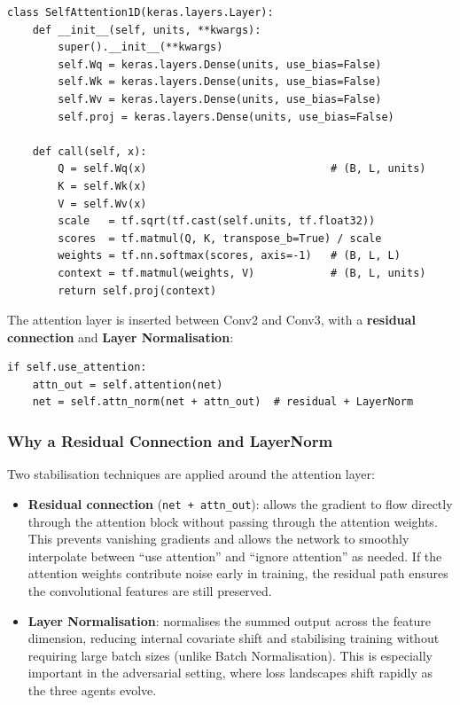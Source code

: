 \documentclass[12pt, a4paper]{article}
\newcommand{\code}[1]{\texttt{\color{CodeRed}#1}}
\begin{document}
\begin{lstlisting}[caption={\code{SelfAttention1D} in \code{main\_enhanced.py}}]
class SelfAttention1D(keras.layers.Layer):
    def __init__(self, units, **kwargs):
        super().__init__(**kwargs)
        self.Wq = keras.layers.Dense(units, use_bias=False)
        self.Wk = keras.layers.Dense(units, use_bias=False)
        self.Wv = keras.layers.Dense(units, use_bias=False)
        self.proj = keras.layers.Dense(units, use_bias=False)

    def call(self, x):
        Q = self.Wq(x)                             # (B, L, units)
        K = self.Wk(x)
        V = self.Wv(x)
        scale   = tf.sqrt(tf.cast(self.units, tf.float32))
        scores  = tf.matmul(Q, K, transpose_b=True) / scale
        weights = tf.nn.softmax(scores, axis=-1)   # (B, L, L)
        context = tf.matmul(weights, V)            # (B, L, units)
        return self.proj(context)
\end{lstlisting}

The attention layer is inserted between Conv2 and Conv3, with a
\textbf{residual connection} and \textbf{Layer Normalisation}:

\begin{lstlisting}[caption={Residual attention block in \code{CipherNet.call()}}]
if self.use_attention:
    attn_out = self.attention(net)
    net = self.attn_norm(net + attn_out)  # residual + LayerNorm
\end{lstlisting}

\subsubsection*{Why a Residual Connection and LayerNorm}

Two stabilisation techniques are applied around the attention layer:

\begin{itemize}[leftmargin=1.8em, itemsep=4pt]
  \item \textbf{Residual connection} (\code{net + attn\_out}): allows
        the gradient to flow directly through the attention block
        without passing through the attention weights. This prevents
        vanishing gradients and allows the network to smoothly
        interpolate between ``use attention'' and ``ignore attention''
        as needed. If the attention weights contribute noise early
        in training, the residual path ensures the convolutional
        features are still preserved.
  \item \textbf{Layer Normalisation}: normalises the summed output
        across the feature dimension, reducing internal covariate
        shift and stabilising training without requiring large
        batch sizes (unlike Batch Normalisation). This is especially
        important in the adversarial setting, where loss landscapes
        shift rapidly as the three agents evolve.
\end{itemize}
\end{document}
